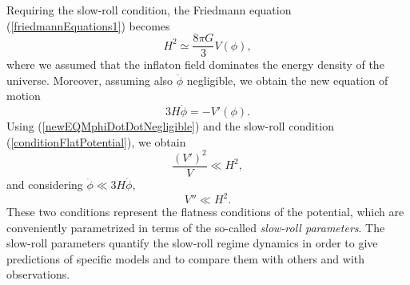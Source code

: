 \documentclass[11pt,a4paper,twoside]{book}
\begin{document}
Requiring the slow-roll condition, the Friedmann equation (\ref{friedmannEquations1}) becomes 
\begin{equation}
	\label{friedMannEqDuringInflation}
	H^{2} \simeq \frac{8\pi G}{3} V(\phi),
\end{equation}
where we assumed that the inflaton field dominates the energy density of the universe. Moreover, assuming also $\ddot{\phi}$ negligible, we obtain the new equation of motion
\begin{equation}
	\label{newEQMphiDotDotNegligible}
	3H\dot{\phi} = -V'(\phi).
\end{equation}
Using (\ref{newEQMphiDotDotNegligible}) and the slow-roll condition (\ref{conditionFlatPotential}), we obtain
\begin{equation}
	\label{condition1}
	\frac{(V')^{2}}{V} \ll H^{2},
\end{equation}
and considering $\ddot{\phi} \ll 3H\dot{\phi}$,
\begin{equation}
	\label{condition2}
V'' \ll H^{2}.	
\end{equation}
These two conditions represent the flatness conditions of the potential, which are conveniently parametrized in terms of the so-called \textit{slow-roll parameters}.
The slow-roll parameters quantify the slow-roll regime dynamics in order to give predictions of specific models and to compare them with others and with observations.
\end{document}
